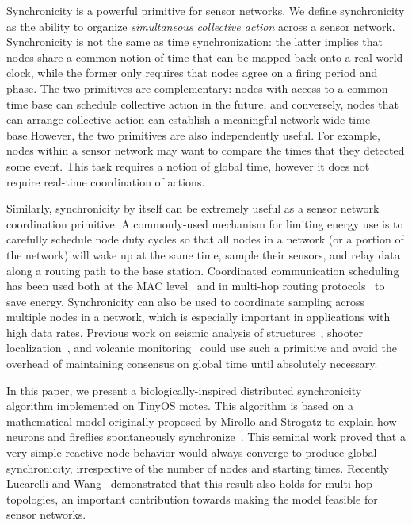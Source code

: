 \documentclass{sig-alternate}
\begin{document}

Synchronicity is a powerful primitive for sensor networks. We define
synchronicity as the ability to organize {\em simultaneous collective
action} across a sensor network. Synchronicity is not the same as time
synchronization: the latter implies that nodes share a common notion
of time that can be mapped back onto a real-world clock, while the
former only requires that nodes agree on a firing period and phase.
The two primitives are complementary: nodes with access to a common
time base can schedule collective action in the future, and
conversely, nodes that can arrange collective action can establish a
meaningful network-wide time base.However, the two primitives are also
independently useful. For example, nodes within a sensor network may
want to compare the times that they detected some event. This task
requires a notion of global time, however it does not require
real-time coordination of actions. 

Similarly, synchronicity by itself can be extremely useful as a sensor
network coordination primitive. A commonly-used mechanism for limiting
energy use is to carefully schedule node duty cycles so that all nodes
in a network (or a portion of the network) will wake up at the same
time, sample their sensors, and relay data along a routing path to the
base station. Coordinated communication scheduling has been used both
at the MAC level~\cite{s-mac} and in multi-hop routing
protocols~\cite{stem} to save energy. Synchronicity can also be
used to coordinate sampling across multiple nodes in a network,
which is especially important in applications with high data
rates. Previous work on seismic analysis of
structures~\cite{glaser-smart-buildings}, shooter
localization~\cite{shooter-localization}, and volcanic
monitoring~\cite{volcano-ewsn05} could use such a primitive and avoid
the overhead of maintaining consensus on global time until
absolutely necessary.

In this paper, we present a biologically-inspired distributed
synchronicity algorithm implemented on TinyOS motes. This algorithm is
based on a mathematical model originally proposed by Mirollo and
Strogatz to explain how neurons and fireflies spontaneously
synchronize~\cite{strogatz}. This seminal work proved that a very
simple reactive node behavior would always converge to produce global
synchronicity, irrespective of the number of nodes and starting
times. Recently Lucarelli and Wang~\cite{lucarelli04} demonstrated
that this result also holds for multi-hop topologies, an important
contribution towards making the model feasible for sensor networks.
\end{document}
